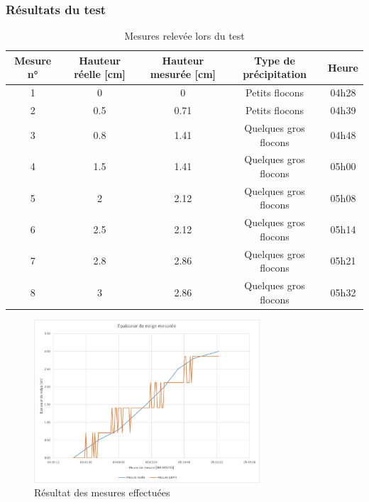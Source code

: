 \subsubsection{Résultats du test}

\begin{table}[H]
    \centering
    \begin{tabular}{|c|c|c|c|c|}
        \hline
        Mesure n° & Hauteur réelle [cm] & Hauteur mesurée [cm] & Type de précipitation & Heure \\
        \hline\hline
        1 & 0 & 0 & Petits flocons & 04h28 \\
        \hline
        2 & 0.5 & 0.71 & Petits flocons & 04h39 \\
        \hline
        3 & 0.8 & 1.41 & Quelques gros flocons & 04h48 \\
        \hline
        4 & 1.5 & 1.41 & Quelques gros flocons & 05h00 \\
        \hline
        5 & 2 & 2.12 & Quelques gros flocons & 05h08 \\
        \hline
        6 & 2.5 & 2.12 & Quelques gros flocons & 05h14 \\
        \hline
        7 & 2.8 & 2.86 & Quelques gros flocons & 05h21 \\
        \hline
        8 & 3 & 2.86 & Quelques gros flocons & 05h32 \\
        \hline
        
    \end{tabular}
    \caption{Mesures relevée lors du test}
    \label{SnowingState}
\end{table}

\begin{figure}[H]
    \centering
    \includegraphics[width=0.75\textwidth]{Images/LiDAR/ReadTests_Results.png}
    \caption{Résultat des mesures effectuées}
    \label{RealTest_Results}
\end{figure}

